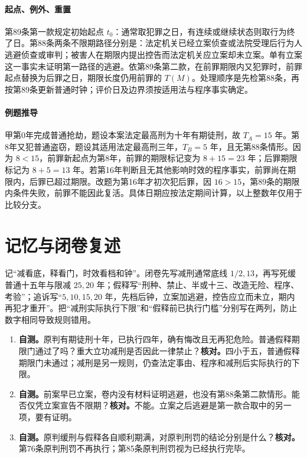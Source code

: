 \paragraph{起点、例外、重置}
第89条第一款规定初始起点 \(t_0\)：通常取犯罪之日，有连续或继续状态则取行为终了日。第88条两条不限期路径分别是：法定机关已经立案侦查或法院受理后行为人逃避侦查或审判；被害人在期限内提出控告而法定机关应立案却未立案。单有立案这一事实未证明第一路径的逃避。依第89条第二款，在前罪期限内又犯罪时，前罪起点替换为后罪之日，期限长度仍用前罪的 \(T(M)\)。处理顺序是先检第88条，再按第89条更新普通时钟；评价日及边界须按适用法与程序事实确定。

\paragraph{例题推导}
甲第0年完成普通抢劫，题设本案法定最高刑为十年有期徒刑，故 \(T_A=15\) 年。第8年又犯普通盗窃，题设其适用法定最高刑三年，\(T_B=5\) 年，且无第88条情形。因为 \(8<15\)，前罪新起点为第8年，前罪的期限标记变为 \(8+15=23\) 年；后罪期限标记为 \(8+5=13\) 年。若第16年判断且无其他影响时效的程序事实，前罪尚在期限内，后罪已超过期限。改题为第16年才初次犯后罪，因 \(16>15\)，第89条的期限内条件失败，前罪不能因此复活。具体日期应按法定期间计算，以上整数年仅用于比较分支。

\section*{记忆与闭卷复述}
记“减看底，释看门，时效看档和钟”。闭卷先写减刑通常底线 \(1/2,13\)，再写死缓普通十五年与限减 \(25,20\) 年；假释写“刑种、禁止、半或十三、改造无险、程序、考验”；追诉写“\(5,10,15,20\) 年，先档后钟，立案加逃避，控告应立而未立，期内再犯才重开”。把“减刑实际执行下限”和“假释前已执行门槛”分别写在两列，防止数字相同导致规则错用。
\begin{enumerate}
 \item \textbf{自测。}原判有期徒刑十年，已执行四年，确有悔改且无再犯危险。普通假释期限门通过了吗？重大立功减刑是否因此一律禁止？\quad\textbf{核对。}四小于五，普通假释期限门未通过；减刑是另一规则，仍查法定事由、程序和减刑后实际执行的下限。
 \item \textbf{自测。}前案早已立案，卷内没有材料证明逃避，也没有第88条第二款情形。能否仅凭立案宣告不限期？\quad\textbf{核对。}不能。立案之后逃避是第一款合取中的另一项，要有证明。
 \item \textbf{自测。}原判缓刑与假释各自顺利期满，对原判刑罚的结论分别是什么？\quad\textbf{核对。}第76条原判刑罚不再执行；第85条原判刑罚视为已经执行完毕。
\end{enumerate}
